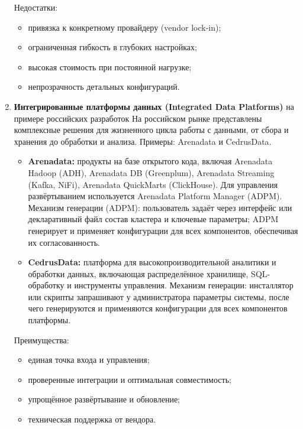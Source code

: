 \begin{enumerate}
	      Недостатки:
	      \begin{itemize}
		      \item привязка к конкретному провайдеру (vendor lock-in);
		      \item ограниченная гибкость в глубоких настройках;
		      \item высокая стоимость при постоянной нагрузке;
		      \item непрозрачность детальных конфигураций.
	      \end{itemize}
	\item \textbf{Интегрированные платформы данных (Integrated Data Platforms)} на примере российских разработок
	      На российском рынке представлены комплексные решения для жизненного цикла работы с данными, от сбора и хранения до обработки и анализа. Примеры: Arenadata\cite{arenadata} и CedrusData\cite{cedrus}.
	      \begin{itemize}

		      \item \textbf{Arenadata:} продукты на базе открытого кода, включая Arenadata Hadoop (ADH), Arenadata DB (Greenplum), Arenadata Streaming (Kafka, NiFi), Arenadata QuickMarts (ClickHouse). Для управления развёртыванием используется Arenadata Platform Manager (ADPM).
		            Механизм генерации (ADPM): пользователь задаёт через интерфейс или декларативный файл состав кластера и ключевые параметры; ADPM генерирует и применяет конфигурации для всех компонентов, обеспечивая их согласованность.

		      \item \textbf{CedrusData:} платформа для высокопроизводительной аналитики и обработки данных, включающая распределённое хранилище, SQL-обработку и инструменты управления.
		            Механизм генерации: инсталлятор или скрипты запрашивают у администратора параметры системы, после чего генерируются и применяются конфигурации для всех компонентов платформы.
	      \end{itemize}
	      Преимущества:
	      \begin{itemize}
		      \item единая точка входа и управления;
		      \item проверенные интеграции и оптимальная совместимость;
		      \item упрощённое развёртывание и обновление;
		      \item техническая поддержка от вендора.
	      \end{itemize}


\end{enumerate}
